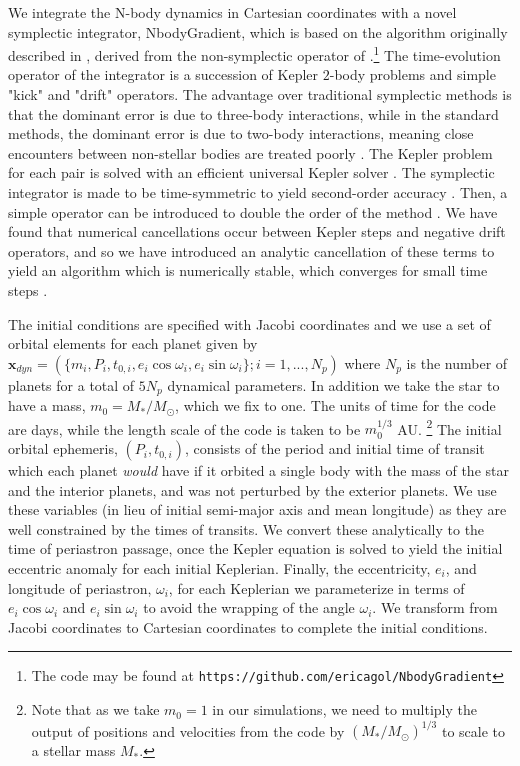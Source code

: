 \documentclass[fleqn,usenatbib]{mnras} %
\begin{document}
We integrate the N-body dynamics in Cartesian coordinates with a novel symplectic 
integrator, \textsf{NbodyGradient}, which is based on the algorithm originally described in \cite{Hernandez2015}, derived from the non-symplectic operator of \cite{GoncalvesFerrari2014}.\footnote{The code may be found at 
\texttt{https://github.com/ericagol/NbodyGradient}}  The time-evolution operator of the integrator is a succession of Kepler $2$-body problems and simple "kick" and "drift" operators.  %
The advantage over traditional symplectic methods \citep{Wisdom1991} is that the dominant error is due to three-body interactions, while in the standard methods, the dominant error is due to two-body interactions, meaning close encounters between non-stellar bodies are treated poorly \citep{Hernandez2017}.    The Kepler problem
for each pair is solved with an efficient universal Kepler solver \citep{Wisdom2015}.
The symplectic integrator is made to be time-symmetric to yield second-order
accuracy \citep{Hernandez2015}.  Then, a simple operator can be introduced to double the order of the method \citep{Dehnen2017}.
We have found that numerical cancellations occur between Kepler steps
and negative drift operators, and so we have introduced an analytic cancellation
of these terms to yield an algorithm which is numerically stable,
which converges for small time steps \citep{Agol2020}.

The initial conditions are specified with Jacobi coordinates and
we use a set of orbital elements for each planet given by
$\mathbf{x}_{dyn} = (\{m_i,P_i,t_{0,i},e_i \cos{\omega_i},e_i\sin{\omega_i}\}; i = 1,...,N_p)$ 
where $N_p$ is the number of planets for a total of $5N_p$ dynamical parameters. In
addition we take the star to have a mass, $m_0 = M_*/M_\odot$, which we fix to one.
The units of time for the code are days, while the length scale of the code is taken to be $m_0^{1/3}$ AU. \footnote{Note that as we take $m_0=1$ in our simulations, we need to multiply
the output of positions and velocities from the code by $(M_*/M_\odot)^{1/3}$ to scale to a stellar mass $M_*$.}
The initial orbital ephemeris, $(P_i,t_{0,i})$, consists of the period and initial time of
transit which each planet {\it would} have if it orbited a single
body with the mass of the star and the interior planets, and was
not perturbed by the exterior planets.  We use these variables (in lieu of initial semi-major axis and mean longitude) as
they are well constrained by the times of transits.  We convert
these analytically to the time of periastron passage, once the
Kepler equation is solved to yield the initial eccentric anomaly
for each initial Keplerian.  Finally, the eccentricity, $e_i$, and
longitude of periastron, $\omega_i$, for each Keplerian we
parameterize in terms of $e_i\cos{\omega_i}$ and $e_i\sin{\omega_i}$
to avoid the wrapping of the angle $\omega_i$.   We transform from Jacobi coordinates to Cartesian coordinates to complete the initial conditions.
\end{document}
